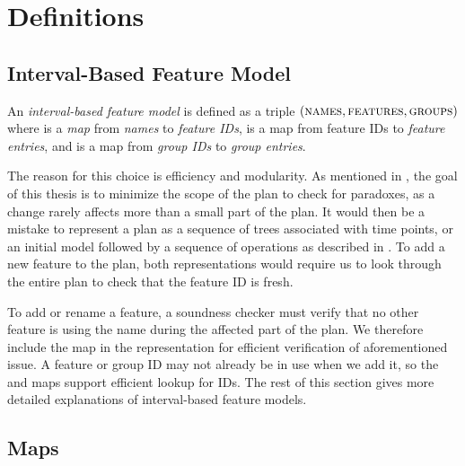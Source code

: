 \section{Definitions}

\subsection{Interval-Based Feature Model}
\label{sub:interval-based-feature-model}

\begin{definition}
  An \emph{interval-based feature model} is defined as a triple $(\textsc{names}, \textsc{features}, \textsc{groups}{})$ where \names{} is a \emph{map} from \emph{names} to \emph{feature IDs}, \features{} is a map from feature IDs to \emph{feature entries}, and \groups{} is a map from \emph{group IDs} to \emph{group entries}. 
  \label{def:interval-based-feature-model}
\end{definition}

The reason for this choice is efficiency and modularity. As mentioned in , the goal of this thesis is to minimize the scope of the plan to check for paradoxes, as a change rarely affects more than a small part of the plan. It would then be a mistake to represent a plan as a sequence of trees associated with time points, or an initial model followed by a sequence of operations as described in  \parencite{art:consistency-preserving-evolution-planning}. To add a new feature to the plan, both representations would require us to look through the entire plan to check that the feature ID is fresh.

To add or rename a feature, a soundness checker must verify that no other feature is using the name during the affected part of the plan. We therefore include the \names{} map in the representation for efficient verification of aforementioned issue. A feature or group ID may not already be in use when we add it, so the \features{} and \groups{} maps support efficient lookup for IDs. The rest of this section gives more detailed explanations of interval-based feature models.

\subsection{Maps}
\label{sub:maps}

